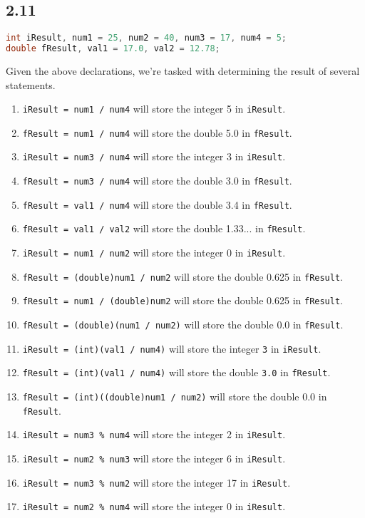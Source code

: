 \documentclass[leqno, 11pt]{article}
\begin{document}
\subsection*{2.11}
\begin{lstlisting}[language=java, xleftmargin=0.25\textwidth]
int iResult, num1 = 25, num2 = 40, num3 = 17, num4 = 5;
double fResult, val1 = 17.0, val2 = 12.78;
\end{lstlisting}
Given the above declarations, we're tasked with determining the result of several statements.
\begin{enumerate}[label=\alph*.]
  \itemsep-0.2em
  \item \texttt{iResult = num1 / num4} will store the integer 5 in \texttt{iResult}.
  \item \texttt{fResult = num1 / num4} will store the double 5.0 in \texttt{fResult}.
  \item \texttt{iResult = num3 / num4} will store the integer 3 in \texttt{iResult}.
  \item \texttt{fResult = num3 / num4} will store the double 3.0 in \texttt{fResult}.
  \item \texttt{fResult = val1 / num4} will store the double 3.4 in \texttt{fResult}.
  \item \texttt{fResult = val1 / val2} will store the double 1.33... in \texttt{fResult}.
  \item \texttt{iResult = num1 / num2} will store the integer 0 in \texttt{iResult}.
  \item \texttt{fResult = (double)num1 / num2} will store the double 0.625 in \texttt{fResult}.
  \item \texttt{fResult = num1 / (double)num2} will store the double 0.625 in \texttt{fResult}.
  \item \texttt{fResult = (double)(num1 / num2)} will store the double 0.0 in \texttt{fResult}.
  \item \texttt{iResult = (int)(val1 / num4)} will store the integer \texttt{3} in \texttt{iResult}.
  \item \texttt{fResult = (int)(val1 / num4)} will store the double \texttt{3.0} in \texttt{fResult}.
  \item \texttt{fResult = (int)((double)num1 / num2)} will store the double 0.0 in \texttt{fResult}.
  \item \texttt{iResult = num3 \% num4} will store the integer 2 in \texttt{iResult}.
  \item \texttt{iResult = num2 \% num3} will store the integer 6 in \texttt{iResult}.
  \item \texttt{iResult = num3 \% num2} will store the integer 17 in \texttt{iResult}.
  \item \texttt{iResult = num2 \% num4} will store the integer 0 in \texttt{iResult}.
\end{enumerate}
\end{document}
